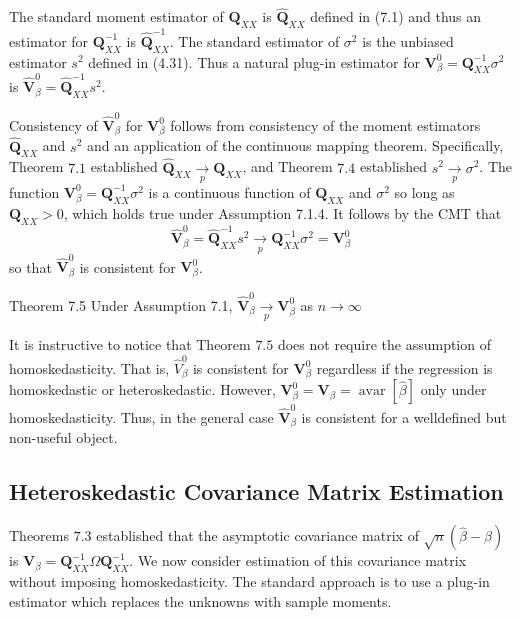 \documentclass[10pt]{article}
\begin{document}
The standard moment estimator of $\boldsymbol{Q}_{X X}$ is $\widehat{\boldsymbol{Q}}_{X X}$ defined in (7.1) and thus an estimator for $\boldsymbol{Q}_{X X}^{-1}$ is $\widehat{\boldsymbol{Q}}_{X X}^{-1}$. The standard estimator of $\sigma^{2}$ is the unbiased estimator $s^{2}$ defined in (4.31). Thus a natural plug-in estimator for $\boldsymbol{V}_{\beta}^{0}=\boldsymbol{Q}_{X X}^{-1} \sigma^{2}$ is $\widehat{\boldsymbol{V}}_{\beta}^{0}=\widehat{\boldsymbol{Q}}_{X X}^{-1} s^{2}$.

Consistency of $\widehat{\boldsymbol{V}}_{\beta}^{0}$ for $\boldsymbol{V}_{\beta}^{0}$ follows from consistency of the moment estimators $\widehat{\boldsymbol{Q}}_{X X}$ and $s^{2}$ and an application of the continuous mapping theorem. Specifically, Theorem $7.1$ established $\widehat{\boldsymbol{Q}}_{X X} \underset{p}{\rightarrow} \boldsymbol{Q}_{X X}$, and Theorem $7.4$ established $s^{2} \underset{p}{\rightarrow} \sigma^{2}$. The function $\boldsymbol{V}_{\beta}^{0}=\boldsymbol{Q}_{X X}^{-1} \sigma^{2}$ is a continuous function of $\boldsymbol{Q}_{X X}$ and $\sigma^{2}$ so long as $\boldsymbol{Q}_{X X}>0$, which holds true under Assumption 7.1.4. It follows by the CMT that
$$
\widehat{\boldsymbol{V}}_{\beta}^{0}=\widehat{\boldsymbol{Q}}_{X X}^{-1} s^{2} \underset{p}{\longrightarrow} \boldsymbol{Q}_{X X}^{-1} \sigma^{2}=\boldsymbol{V}_{\beta}^{0}
$$
so that $\widehat{\boldsymbol{V}}_{\beta}^{0}$ is consistent for $\boldsymbol{V}_{\beta}^{0}$.

Theorem 7.5 Under Assumption 7.1, $\widehat{\boldsymbol{V}}_{\beta}^{0} \underset{p}{\rightarrow} \boldsymbol{V}_{\beta}^{0}$ as $n \rightarrow \infty$

It is instructive to notice that Theorem $7.5$ does not require the assumption of homoskedasticity. That is, $\widehat{V}_{\beta}^{0}$ is consistent for $\boldsymbol{V}_{\beta}^{0}$ regardless if the regression is homoskedastic or heteroskedastic. However, $\boldsymbol{V}_{\beta}^{0}=\boldsymbol{V}_{\beta}=\operatorname{avar}[\widehat{\beta}]$ only under homoskedasticity. Thus, in the general case $\widehat{\boldsymbol{V}}_{\beta}^{0}$ is consistent for a welldefined but non-useful object.

\subsection{Heteroskedastic Covariance Matrix Estimation}
Theorems $7.3$ established that the asymptotic covariance matrix of $\sqrt{n}(\widehat{\beta}-\beta)$ is $\boldsymbol{V}_{\beta}=\boldsymbol{Q}_{X X}^{-1} \Omega \boldsymbol{Q}_{X X}^{-1}$. We now consider estimation of this covariance matrix without imposing homoskedasticity. The standard approach is to use a plug-in estimator which replaces the unknowns with sample moments.
\end{document}
